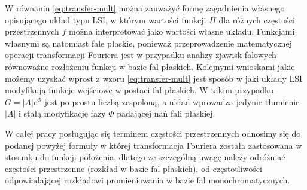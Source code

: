 W równaniu \ref{eq:transfer-mult} można zauważyć formę zagadnienia własnego opisującego układ typu LSI, w którym wartości funkcji $H$ dla różnych częstości przestrzennych $f$ można interpretować jako wartości własne układu. Funkcjami własnymi są natomiast fale płaskie, ponieważ przeprowadzenie matematycznej operacji transformacji Fouriera jest w przypadku analizy zjawisk falowych równoważne rozłożeniu funkcji w bazie fal płaskich.  Kolejnymi wnioskami jakie możemy uzyskać wprost z wzoru \ref{eq:transfer-mult} jest sposób w jaki układy LSI modyfikują funkcje wejściowe w postaci fal płaskich. W takim przypadku $G=|A|e^{\Phi}$ jest po prostu liczbą zespoloną, a układ wprowadza jedynie tłumienie $|A|$ i stałą modyfikację fazy $\Phi$ padającej nań fali płaskiej\cite{citeulike:2926459}.

W całej pracy posługując się terminem częstości przestrzennych odnosimy się do podanej powyżej formuły w której transformacja Fouriera została zastosowana w stosunku do funkcji położenia, dlatego ze szczególną uwagę należy odróżniać częstości przestrzenne (rozkład w bazie fal płaskich), od częstotliwości odpowiadającej rozkładowi promieniowania w bazie fal monochromatycznych.

